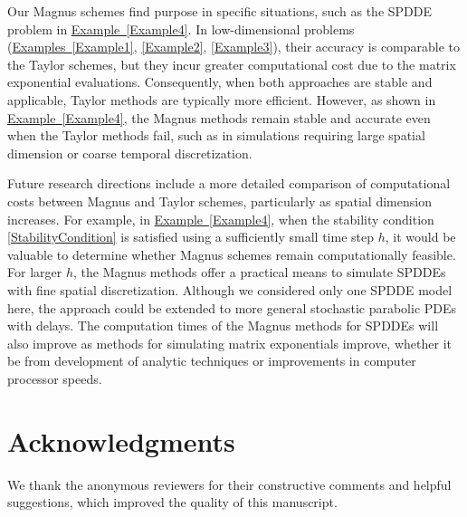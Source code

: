 \documentclass[onefignum]{siamart250211}
\begin{document}

Our Magnus schemes find purpose in specific situations, such as the SPDDE problem in \hyperref[Example4]{Example~\ref*{Example4}}. In low-dimensional problems (\hyperref[Example1]{Examples~\ref*{Example1}}, \ref{Example2}, \ref{Example3}), their accuracy is comparable to the Taylor schemes, but they incur greater computational cost due to the matrix exponential evaluations. Consequently, when both approaches are stable and applicable, Taylor methods are typically more efficient. However, as shown in \hyperref[Example4]{Example~\ref*{Example4}}, the Magnus methods remain stable and accurate even when the Taylor methods fail, such as in simulations requiring large spatial dimension or coarse temporal discretization.


Future research directions include a more detailed comparison of computational costs between Magnus and Taylor schemes, particularly as spatial dimension increases. For example, in \hyperref[Example4]{Example~\ref*{Example4}}, when the stability condition \cref{StabilityCondition} is satisfied using a sufficiently small time step $h$, it would be valuable to determine whether Magnus schemes remain computationally feasible. For larger $h$, the Magnus methods offer a practical means to simulate SPDDEs with fine spatial discretization. Although we considered only one SPDDE model here, the approach could be extended to more general stochastic parabolic PDEs with delays. The computation times of the Magnus methods for SPDDEs will also improve as methods for simulating matrix exponentials improve, whether it be from development of analytic techniques or improvements in computer processor speeds.





\section*{Acknowledgments}
We thank the anonymous reviewers for their constructive comments and helpful suggestions, which improved the quality of this manuscript.

\appendix


\end{document}
